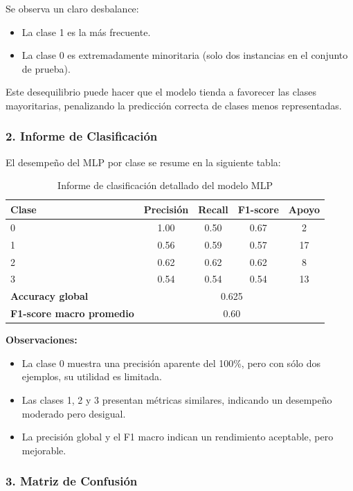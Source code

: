 \documentclass[11pt,a4paper]{article}
\begin{document}
Se observa un claro desbalance:
\begin{itemize}
    \item La clase 1 es la más frecuente.
    \item La clase 0 es extremadamente minoritaria (solo dos instancias en el conjunto de prueba).
\end{itemize}

Este desequilibrio puede hacer que el modelo tienda a favorecer las clases mayoritarias, penalizando la predicción correcta de clases menos representadas.

\subsubsection*{2. Informe de Clasificación}

El desempeño del MLP por clase se resume en la siguiente tabla:

\begin{table}[H]
\centering
\begin{tabular}{lcccc}
\toprule
\textbf{Clase} & \textbf{Precisión} & \textbf{Recall} & \textbf{F1-score} & \textbf{Apoyo} \\
\midrule
0 & 1.00 & 0.50 & 0.67 & 2 \\
1 & 0.56 & 0.59 & 0.57 & 17 \\
2 & 0.62 & 0.62 & 0.62 & 8 \\
3 & 0.54 & 0.54 & 0.54 & 13 \\
\midrule
\textbf{Accuracy global} & \multicolumn{4}{c}{0.625} \\
\textbf{F1-score macro promedio} & \multicolumn{4}{c}{0.60} \\
\bottomrule
\end{tabular}
\caption{Informe de clasificación detallado del modelo MLP}
\end{table}

\textbf{Observaciones:}
\begin{itemize}
    \item La clase 0 muestra una precisión aparente del 100\%, pero con sólo dos ejemplos, su utilidad es limitada.
    \item Las clases 1, 2 y 3 presentan métricas similares, indicando un desempeño moderado pero desigual.
    \item La precisión global y el F1 macro indican un rendimiento aceptable, pero mejorable.
\end{itemize}

\subsubsection*{3. Matriz de Confusión}
\end{document}
